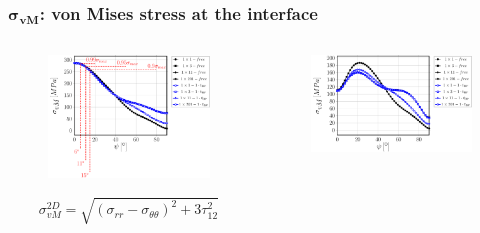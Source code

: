 \documentclass[first,firstsupp,lastsupp,last,hyperref,table]{ETHclass}
\begin{document}
\begin{frame}
\frametitle{\vspace{0.2cm}\small $\mathbf{\sigma_{vM}}$: von Mises stress at the interface}
\vspace{-.75cm}
\centering
\begin{columns}[c]
\centering
\begin{column}{0.5\textwidth}
\centering
\begin{figure}
\centering
\includegraphics[width=\columnwidth]{vf60-nodamage-vM2D.pdf}
\end{figure}
\vspace{-0.5cm}
\scriptsize
\begin{equation*}
\sigma^{2D}_{vM}=\sqrt{\left(\sigma_{rr}-\sigma_{\theta\theta}\right)^{2}+3\tau_{12}^{2}}
\end{equation*}
\end{column}
\begin{column}{0.5\textwidth}
\centering
\begin{figure}
\centering
\includegraphics[width=\columnwidth]{vf60-nodamage-vM3D.pdf}

\end{figure}
\end{column}
\end{columns}
\end{frame}
\end{document}
